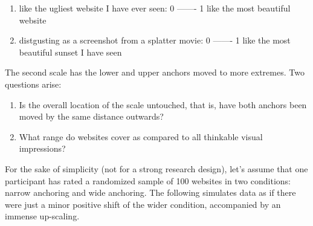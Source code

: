\documentclass[]{svmono}
\providecommand{\tightlist}{%
  \setlength{\itemsep}{0pt}\setlength{\parskip}{0pt}}
\theoremstyle{definition}
\theoremstyle{definition}
\theoremstyle{definition}
\theoremstyle{remark}
\begin{document}
\begin{enumerate}
\def\labelenumi{\arabic{enumi}.}
\tightlist
\item
  like the ugliest website I have ever seen: 0 ------- 1 like the most
  beautiful website
\item
  distgusting as a screenshot from a splatter movie: 0 ------- 1 like
  the most beautiful sunset I have seen
\end{enumerate}

The second scale has the lower and upper anchors moved to more extremes.
Two questions arise:

\begin{enumerate}
\def\labelenumi{\arabic{enumi}.}
\tightlist
\item
  Is the overall location of the scale untouched, that is, have both
  anchors been moved by the same distance outwards?
\item
  What range do websites cover as compared to all thinkable visual
  impressions?
\end{enumerate}

For the sake of simplicity (not for a strong research design), let's
assume that one participant has rated a randomized sample of 100
websites in two conditions: narrow anchoring and wide anchoring. The
following simulates data as if there were just a minor positive shift of
the wider condition, accompanied by an immense up-scaling.
\end{document}
